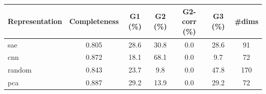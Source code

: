 \begin{tabular}{lcccccc}
\toprule
Representation & Completeness & G1 (\%) & G2 (\%) & G2-corr (\%) & G3 (\%) & \#dims \\
\midrule
sae & 0.805 & 28.6 & 30.8 & 0.0 & 28.6 & 91 \\
cnn & 0.872 & 18.1 & 68.1 & 0.0 & 9.7 & 72 \\
random & 0.843 & 23.7 & 9.8 & 0.0 & 47.8 & 170 \\
pca & 0.887 & 29.2 & 13.9 & 0.0 & 29.2 & 72 \\
\bottomrule
\end{tabular}